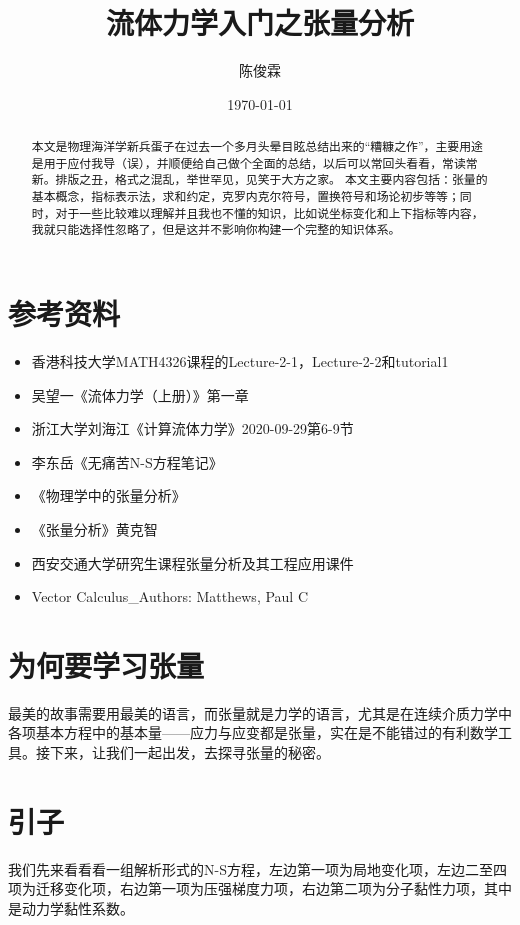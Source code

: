 \documentclass{ctexart}
\title{流体力学入门之张量分析}
\author{陈俊霖}
\date{\today}
\begin{document}
\maketitle
\tableofcontents

\begin{abstract}
本文是物理海洋学新兵蛋子在过去一个多月头晕目眩总结出来的“糟糠之作”，主要用途是用于应付我导（误），并顺便给自己做个全面的总结，以后可以常回头看看，常读常新。排版之丑，格式之混乱，举世罕见，见笑于大方之家。
本文主要内容包括：张量的基本概念，指标表示法，求和约定，克罗内克尔符号，置换符号和场论初步等等；同时，对于一些比较难以理解并且我也不懂的知识，比如说坐标变化和上下指标等内容，我就只能选择性忽略了，但是这并不影响你构建一个完整的知识体系。

\end{abstract}

\section{参考资料}
    \begin{itemize}
    \item{香港科技大学MATH4326课程的Lecture-2-1，Lecture-2-2和tutorial1}
    \item{吴望一《流体力学（上册）》第一章}
    \item{浙江大学刘海江《计算流体力学》2020-09-29第6-9节}
    \item{李东岳《无痛苦N-S方程笔记》}
    \item{《物理学中的张量分析》}
    \item{《张量分析》黄克智}
    \item{西安交通大学研究生课程张量分析及其工程应用课件}
    \item{Vector Calculus_Authors: Matthews, Paul C}
    \end{itemize}
    
\section{为何要学习张量}
最美的故事需要用最美的语言，而张量就是力学的语言，尤其是在连续介质力学中各项基本方程中的基本量——应力与应变都是张量，实在是不能错过的有利数学工具。接下来，让我们一起出发，去探寻张量的秘密。

\section{引子}
\par
我们先来看看看一组解析形式的N-S方程，左边第一项为局地变化项，左边二至四项为迁移变化项，右边第一项为压强梯度力项，右边第二项为分子黏性力项，其中是动力学黏性系数。
\end{document}
